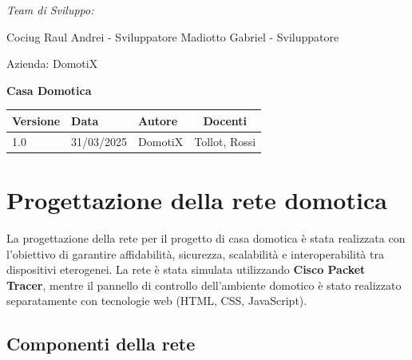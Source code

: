 \documentclass[a4paper,12pt]{article}
\begin{document}
\begin{titlepage}
    \begin{minipage}[t]{0.4\textwidth}
    \raggedright
    {\large\itshape Team di Sviluppo:\par}
    \vspace{0.2cm}
    
    Cociug Raul Andrei - Sviluppatore 
    Madiotto Gabriel - Sviluppatore
    \end{minipage}
    \hfill
    \begin{minipage}[t]{0.4\textwidth}
    \raggedleft
    {\Large Azienda: DomotiX\par}
    \end{minipage}
    
    \centering
    \vspace*{5cm}
    
    {\Huge\bfseries Casa Domotica\par}
    \vspace{1.5cm}
    
    \vfill
    
    \begin{table}[h]
    \centering
    \begin{tabular}{@{}lllc@{}}
    \toprule
    Versione & Data & Autore & Docenti \\
    \midrule
    1.0 & 31/03/2025 & DomotiX & Tollot, Rossi \\
    \bottomrule
    \end{tabular}
    \end{table}
    
    \thispagestyle{empty}
\end{titlepage}
\tableofcontents
\newpage

\section{Progettazione della rete domotica}

La progettazione della rete per il progetto di casa domotica è stata realizzata con l’obiettivo di garantire affidabilità, sicurezza, scalabilità e interoperabilità tra dispositivi eterogenei. La rete è stata simulata utilizzando \textbf{Cisco Packet Tracer}, mentre il pannello di controllo dell’ambiente domotico è stato realizzato separatamente con tecnologie web (HTML, CSS, JavaScript).

\subsection{Componenti della rete}
\end{document}
